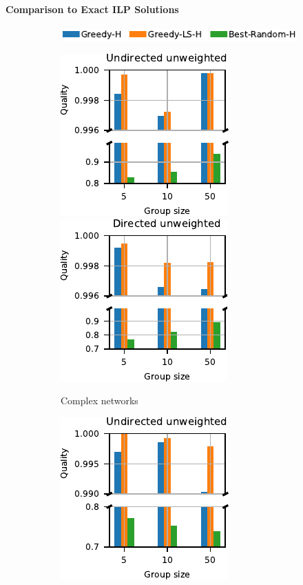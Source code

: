 \paragraph{Comparison to Exact ILP Solutions}
%
\begin{figure}[tb]
\begin{subfigure}[t]{\textwidth}
\centering
\includegraphics{./sources/plots/gh-gc-apx/legend-exact-harmonic.pdf}
\end{subfigure}\medskip

\begin{subfigure}[t]{.5\textwidth}
\centering
\includegraphics[width=.49\textwidth]{./sources/plots/gh-gc-apx/quality-ilp-harmonic-small-diameter-undirected-unweighted.pdf}
\includegraphics[width=.49\textwidth]{./sources/plots/gh-gc-apx/quality-ilp-harmonic-small-diameter-directed-unweighted.pdf}
\caption{Complex networks}
\label{fig:gh-gc-apx:qual-vs-opt-gh-cplx}
\end{subfigure}\hfill
\begin{subfigure}[t]{.5\textwidth}
\centering
\includegraphics[width=.49\textwidth]{./sources/plots/gh-gc-apx/quality-ilp-harmonic-high-diameter-undirected-unweighted.pdf}

\end{subfigure}
\end{figure}
